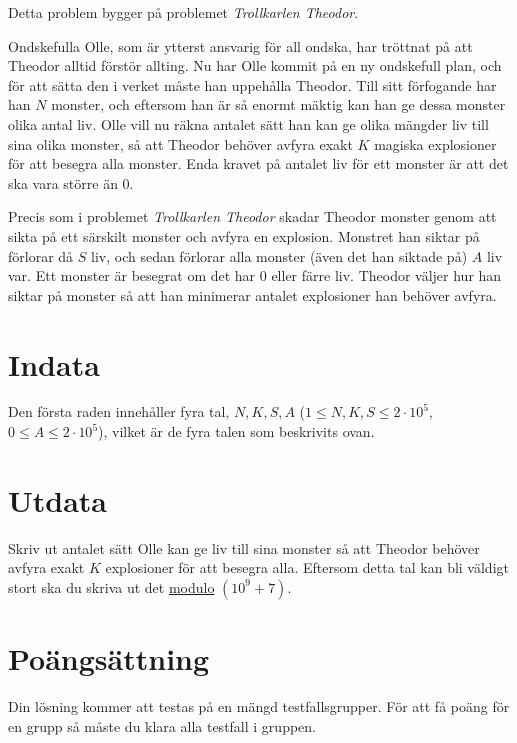 
\noindent

Detta problem bygger på problemet \textit{Trollkarlen Theodor}.

Ondskefulla Olle, som är ytterst ansvarig för all ondska, har tröttnat på att Theodor alltid förstör allting.
Nu har Olle kommit på en ny ondskefull plan, och för att sätta den i verket måste han uppehålla Theodor.
Till sitt förfogande har han $N$ monster, och eftersom han är så enormt mäktig kan han ge dessa monster olika antal liv.
Olle vill nu räkna antalet sätt han kan ge olika mängder liv till sina olika monster, 
så att Theodor behöver avfyra exakt $K$ magiska explosioner för att besegra alla monster. Enda kravet på antalet liv
för ett monster är att det ska vara större än $0$.

Precis som i problemet \textit{Trollkarlen Theodor} skadar Theodor monster genom att sikta på ett särskilt monster och avfyra
en explosion. Monstret han siktar på förlorar då $S$ liv, och sedan förlorar alla monster (även det han siktade på) $A$ liv var. 
Ett monster är besegrat om det har 0 eller färre liv.
Theodor väljer hur han siktar på monster så att han minimerar antalet explosioner han behöver avfyra.


\section*{Indata}
Den första raden innehåller fyra tal, $N, K, S, A$ ($1 \leq N,K,S \leq 2\cdot10^5$, $0 \leq A \leq 2\cdot10^5$), vilket är de fyra talen som beskrivits ovan.

\section*{Utdata}
Skriv ut antalet sätt Olle kan ge liv till sina monster så att Theodor behöver avfyra exakt $K$ explosioner för att besegra alla. Eftersom detta tal kan bli väldigt stort ska
du skriva ut det \href{https://en.wikipedia.org/wiki/Modulo}{modulo} $(10^9+7)$. 



\section*{Poängsättning}
Din lösning kommer att testas på en mängd testfallsgrupper.
För att få poäng för en grupp så måste du klara alla testfall i gruppen.

